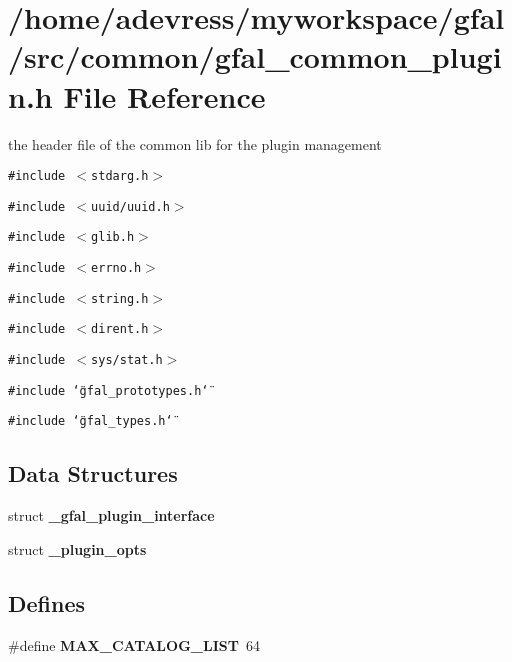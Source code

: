 \section{/home/adevress/myworkspace/gfal/src/common/gfal\_\-common\_\-plugin.h File Reference}
\label{gfal__common__plugin_8h}
the header file of the common lib for the plugin management 

{\tt \#include $<$stdarg.h$>$}\par
{\tt \#include $<$uuid/uuid.h$>$}\par
{\tt \#include $<$glib.h$>$}\par
{\tt \#include $<$errno.h$>$}\par
{\tt \#include $<$string.h$>$}\par
{\tt \#include $<$dirent.h$>$}\par
{\tt \#include $<$sys/stat.h$>$}\par
{\tt \#include \char`\"{}gfal\_\-prototypes.h\char`\"{}}\par
{\tt \#include \char`\"{}gfal\_\-types.h\char`\"{}}\par
\subsection*{Data Structures}
\begin{CompactItemize}
\item 
struct \bf{\_\-gfal\_\-plugin\_\-interface}
\item 
struct \bf{\_\-plugin\_\-opts}
\end{CompactItemize}
\subsection*{Defines}
\begin{CompactItemize}
\item 
\#define \textbf{MAX\_\-CATALOG\_\-LIST}~64\label{gfal__common__plugin_8h_c39f705683e893b91f559704ee2a707e}

\end{CompactItemize}
